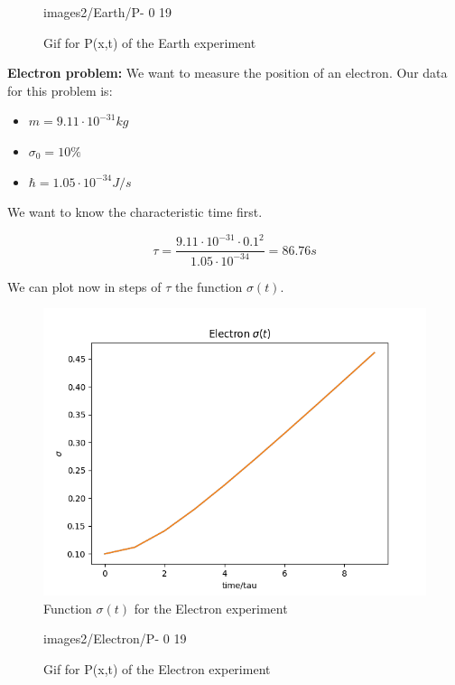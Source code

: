 \begin{figure}[H]
    \centering
    {images2/Earth/P-}%
    {0}%
    {19}%
    \caption{Gif for P(x,t) of the Earth experiment}
    \label{P_earth}
\end{figure}

\textbf{Electron problem: } We want to measure the position of an electron. Our data for this problem is:

\begin{itemize}
    \item $m = 9.11 \cdot 10^{-31} kg$
    \item $ \sigma_0 = 10\% $
    \item $\hbar = 1.05 \cdot 10^{-34} J/s$
\end{itemize}

We want to know the characteristic time first.

\begin{equation}
    \label{2.39}
    \tau = \frac{9.11\cdot 10^{-31}\cdot 0.1^2}{1.05 \cdot 10^{-34}} = 86.76 s 
\end{equation}

We can plot now in steps of $\tau$ the function $\sigma(t)$.

\begin{figure}[H]
    \centering
    \includegraphics{images2/Electron/sigma.png}
    \caption{Function $\sigma(t)$ for the Electron experiment}
    \label{fig:sigma_electron}
\end{figure}

\begin{figure}[H]
    \centering
    {images2/Electron/P-}%
    {0}%
    {19}%
    \caption{Gif for P(x,t) of the Electron experiment}
    \label{P_electron}
\end{figure}

